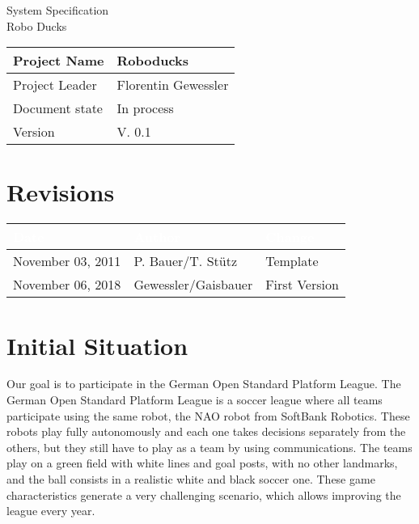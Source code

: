 \documentclass[12pt]{article}
\theoremstyle{definition}
\newcommand{\projectname}{Roboducks}
\newcommand{\productname}{Robo Ducks}
\newcommand{\projectleader}{Florentin Gewessler}
\newcommand{\documentstatus}{In process}
\newcommand{\version}{V. 0.1}
\begin{document}
\begin{titlepage}
\begin{flushright}

\end{flushright}

\vspace{10em}

\begin{center}
{\Huge System Specification} \\[3em]
{\LARGE \productname} \\[3em]
\end{center}

\begin{flushleft}
\begin{tabular}{|l|l|}
\hline
Project Name & \projectname \\ \hline
Project Leader & \projectleader \\ \hline
Document state & \documentstatus \\ \hline
Version & \version \\ \hline
\end{tabular}
\end{flushleft}

\end{titlepage}
\section*{Revisions}
\begin{tabular}{|l|l|l|}
\hline
\cellcolor[gray]{0.5}\textcolor{white}{Date} & \cellcolor[gray]{0.5}\textcolor{white}{Author} & \cellcolor[gray]{0.5}\textcolor{white}{Change} \\ \hline
November 03, 2011&P. Bauer/T. Stütz&Template \\ \hline
November 06, 2018&Gewessler/Gaisbauer&First Version\\ \hline
\end{tabular}
\pagebreak

\tableofcontents
\pagebreak

\section{Initial Situation}


Our goal is to participate in the German Open Standard Platform League. The German Open Standard Platform League is a soccer league where all teams participate using the same robot, the NAO robot from SoftBank Robotics. These robots play fully autonomously and each one takes decisions separately from the others, but they still have to play as a team by using communications. The teams play on a green field with white lines and goal posts, with no other landmarks, and the ball consists in a realistic white and black soccer one. These game characteristics generate a very challenging scenario, which allows improving the league every year. 
\end{document}

